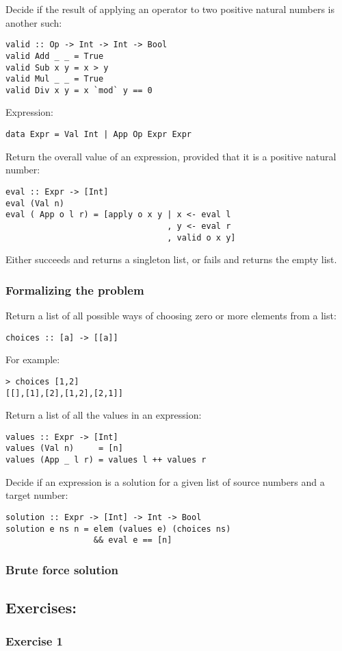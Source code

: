 \begin{multicols}{2}
Decide if the result of applying an operator to two positive natural numbers is another such:
\begin{lstlisting}
valid :: Op -> Int -> Int -> Bool
valid Add _ _ = True
valid Sub x y = x > y
valid Mul _ _ = True
valid Div x y = x `mod` y == 0
\end{lstlisting}

Expression:
\begin{lstlisting}
data Expr = Val Int | App Op Expr Expr
\end{lstlisting}

Return the overall value of an expression, provided that it is a positive natural number:
\begin{lstlisting}
eval :: Expr -> [Int]
eval (Val n)
eval ( App o l r) = [apply o x y | x <- eval l
                                 , y <- eval r
                                 , valid o x y]
\end{lstlisting}
Either succeeds and returns a singleton list, or fails and returns the empty list.

\subsubsection{Formalizing the problem}
Return a list of all possible ways of choosing zero or more elements from a list:
\begin{lstlisting}
choices :: [a] -> [[a]]
\end{lstlisting}

For example:
\begin{lstlisting}
> choices [1,2]
[[],[1],[2],[1,2],[2,1]]
\end{lstlisting}

Return a list of all the values in an expression:
\begin{lstlisting}
values :: Expr -> [Int]
values (Val n)     = [n]
values (App _ l r) = values l ++ values r
\end{lstlisting}

Decide if an expression is a solution for a given list of source numbers and a target number:
\begin{lstlisting}
solution :: Expr -> [Int] -> Int -> Bool
solution e ns n = elem (values e) (choices ns)
                  && eval e == [n]
\end{lstlisting}

\subsubsection{Brute force solution}






\newpage
\subsection{Exercises:}

\subsubsection{Exercise 1}

\end{multicols}
